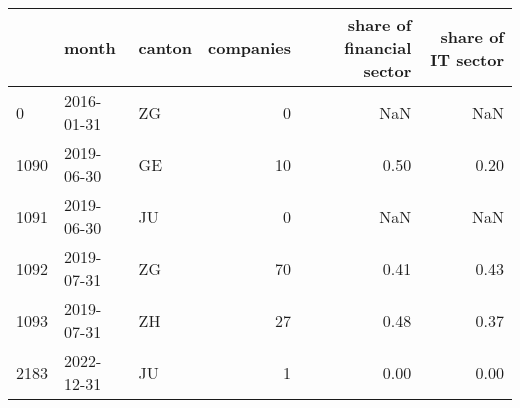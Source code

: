 \begin{tabular}{lllrrr}
\toprule
{} &      month & canton &  companies &  share of financial sector &  share of IT sector \\
\midrule
0    & 2016-01-31 &     ZG &          0 &                        NaN &                 NaN \\
1090 & 2019-06-30 &     GE &         10 &                       0.50 &                0.20 \\
1091 & 2019-06-30 &     JU &          0 &                        NaN &                 NaN \\
1092 & 2019-07-31 &     ZG &         70 &                       0.41 &                0.43 \\
1093 & 2019-07-31 &     ZH &         27 &                       0.48 &                0.37 \\
2183 & 2022-12-31 &     JU &          1 &                       0.00 &                0.00 \\
\bottomrule
\end{tabular}
